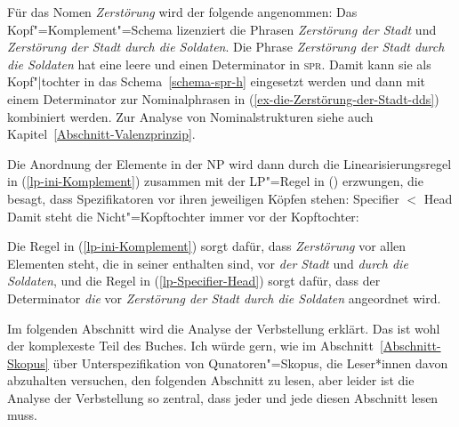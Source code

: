 \noindent
Für das Nomen \emph{Zerstörung} wird der folgende \catw angenommen:
\ea
{}
\z
Das Kopf"=Komplement"=Schema lizenziert die Phrasen  \emph{Zerstörung der Stadt}
und  \emph{Zerstörung der Stadt durch die Soldaten}. Die Phrase  \emph{Zerstörung der Stadt durch
  die Soldaten} hat eine leere \compsl und einen Determinator in \textsc{spr}. Damit kann sie als
Kopf"|tochter in das Schema~\ref{schema-spr-h} eingesetzt werden und dann mit einem Determinator zur
Nominalphrasen in (\ref{ex-die-Zerstörung-der-Stadt-dds}) kombiniert werden. Zur Analyse von
Nominalstrukturen siehe auch Kapitel~\ref{Abschnitt-Valenzprinzip}.

Die Anordnung der Elemente in der NP wird dann durch die Linearisierungsregel in (\ref{lp-ini-Komplement})
zusammen mit der LP"=Regel in () erzwungen, die besagt, dass Spezifikatoren vor ihren
jeweiligen Köpfen stehen:
\ea
\label{lp-Specifier-Head}
Specifier $<$ Head
\z
Damit steht die Nicht"=Kopftochter immer vor der Kopftochter:
\ea
{}
\z

Die Regel in (\ref{lp-ini-Komplement}) sorgt dafür, dass \emph{Zerstörung} vor allen Elementen steht, die in seiner
\compsl enthalten sind, \dash vor \emph{der Stadt} und \emph{durch die Soldaten}, und die Regel in
(\ref{lp-Specifier-Head}) sorgt dafür, dass der Determinator \emph{die} vor \emph{Zerstörung der Stadt durch die
Soldaten} angeordnet wird.

Im folgenden Abschnitt wird die Analyse der Verbstellung erklärt. Das ist wohl der komplexeste Teil
des Buches. Ich würde gern, wie im Abschnitt~\ref{Abschnitt-Skopus} über Unterspezifikation von Qunatoren"=Skopus, die
Leser*innen davon abzuhalten versuchen, den folgenden Abschnitt zu lesen, aber leider ist die
Analyse der Verbstellung so zentral, dass jeder und jede diesen Abschnitt lesen muss.

